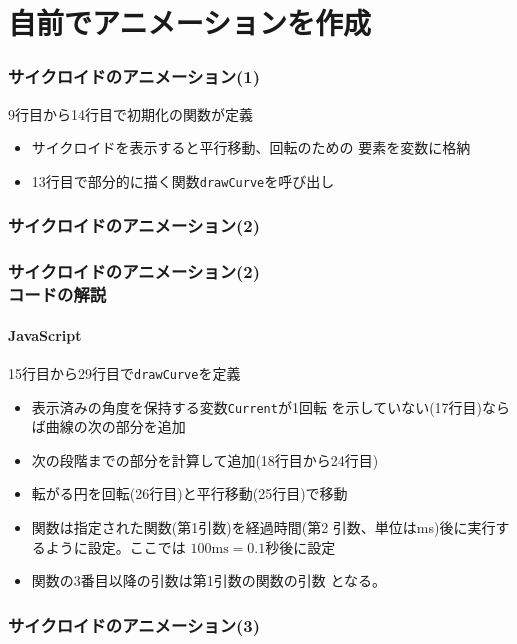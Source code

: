 \section{自前でアニメーションを作成}
\begin{frame}[containsverbatim]
 \frametitle{サイクロイドのアニメーション(1)}
 9行目から14行目で初期化の関数が定義
    \begin{itemize}
     \item サイクロイドを表示すると平行移動、回転のための
           要素を変数に格納
     \item 13行目で部分的に描く関数\texttt{drawCurve}を呼び出し
    \end{itemize}
\end{frame}
\begin{frame}[containsverbatim]
 \frametitle{サイクロイドのアニメーション(2)}
\end{frame}
\begin{frame}[containsverbatim]
 \frametitle{サイクロイドのアニメーション(2)\\コードの解説}
 \framesubtitle{JavaScript}
 15行目から29行目で\texttt{drawCurve}を定義
    \begin{itemize}
     \item 表示済みの角度を保持する変数\texttt{Current}が1回転
           を示していない(17行目)ならば曲線の次の部分を追加
     \item 次の段階までの部分を計算して追加(18行目から24行目)
     \item 転がる円を回転(26行目)と平行移動(25行目)で移動
     \item {}関数は指定された関数(第1引数)を経過時間(第2
           引数、単位はms)後に実行するように設定。ここでは
           $100\mathrm{ms}=0.1$秒後に設定
     \item  {}関数の3番目以降の引数は第1引数の関数の引数
            となる。
    \end{itemize}
\end{frame}
\begin{frame}[containsverbatim]
 \frametitle{サイクロイドのアニメーション(3)}
\end{frame}
